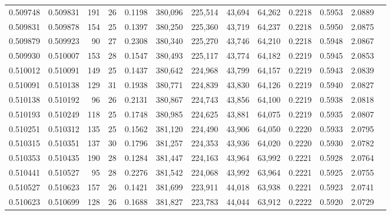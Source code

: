 \begin{tabular}{rrrrrrrrrrrrr}
0.509748 & 0.509831 & 191 &  26 &                                     0.1198 & 380,096 & 225,514 &  43,694 &  64,262 & 0.2218 & 0.5953 & 2.0889 \\
0.509831 & 0.509878 & 154 &  25 &                                     0.1397 & 380,250 & 225,360 &  43,719 &  64,237 & 0.2218 & 0.5950 & 2.0875 \\
0.509879 & 0.509923 &  90 &  27 &                                     0.2308 & 380,340 & 225,270 &  43,746 &  64,210 & 0.2218 & 0.5948 & 2.0867 \\
0.509930 & 0.510007 & 153 &  28 &                                     0.1547 & 380,493 & 225,117 &  43,774 &  64,182 & 0.2219 & 0.5945 & 2.0853 \\
0.510012 & 0.510091 & 149 &  25 &                                     0.1437 & 380,642 & 224,968 &  43,799 &  64,157 & 0.2219 & 0.5943 & 2.0839 \\
0.510091 & 0.510138 & 129 &  31 &                                     0.1938 & 380,771 & 224,839 &  43,830 &  64,126 & 0.2219 & 0.5940 & 2.0827 \\
0.510138 & 0.510192 &  96 &  26 &                                     0.2131 & 380,867 & 224,743 &  43,856 &  64,100 & 0.2219 & 0.5938 & 2.0818 \\
0.510193 & 0.510249 & 118 &  25 &                                     0.1748 & 380,985 & 224,625 &  43,881 &  64,075 & 0.2219 & 0.5935 & 2.0807 \\
0.510251 & 0.510312 & 135 &  25 &                                     0.1562 & 381,120 & 224,490 &  43,906 &  64,050 & 0.2220 & 0.5933 & 2.0795 \\
0.510315 & 0.510351 & 137 &  30 &                                     0.1796 & 381,257 & 224,353 &  43,936 &  64,020 & 0.2220 & 0.5930 & 2.0782 \\
0.510353 & 0.510435 & 190 &  28 &                                     0.1284 & 381,447 & 224,163 &  43,964 &  63,992 & 0.2221 & 0.5928 & 2.0764 \\
0.510441 & 0.510527 &  95 &  28 &                                     0.2276 & 381,542 & 224,068 &  43,992 &  63,964 & 0.2221 & 0.5925 & 2.0755 \\
0.510527 & 0.510623 & 157 &  26 &                                     0.1421 & 381,699 & 223,911 &  44,018 &  63,938 & 0.2221 & 0.5923 & 2.0741 \\
0.510623 & 0.510699 & 128 &  26 &                                     0.1688 & 381,827 & 223,783 &  44,044 &  63,912 & 0.2222 & 0.5920 & 2.0729 \\

\end{tabular}
